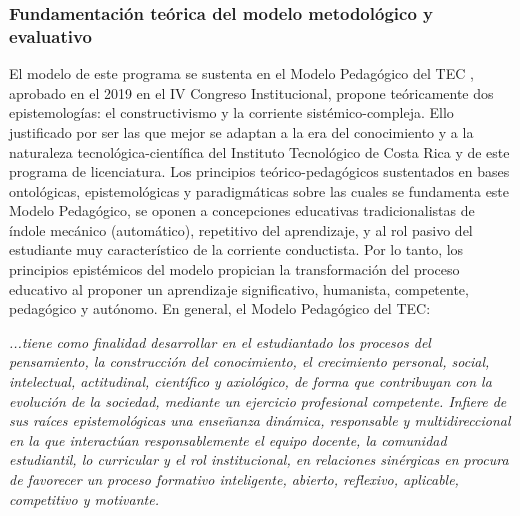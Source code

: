 \subsubsection*{Fundamentación teórica del modelo metodológico y evaluativo}

El modelo de este programa se sustenta en el Modelo Pedagógico del TEC , aprobado en el 2019 en el IV Congreso Institucional, propone teóricamente dos epistemologías: el constructivismo y la corriente sistémico-compleja. Ello justificado por ser las que mejor se adaptan a la era del conocimiento y a la naturaleza tecnológica-científica del Instituto Tecnológico de Costa Rica y de este programa de licenciatura. Los principios teórico-pedagógicos sustentados en bases ontológicas, epistemológicas y paradigmáticas sobre las cuales se fundamenta este Modelo Pedagógico, se oponen a concepciones educativas tradicionalistas de índole mecánico (automático), repetitivo del aprendizaje, y al rol pasivo del estudiante muy característico de la corriente conductista. Por lo tanto, los principios epistémicos del modelo propician la transformación del proceso educativo al proponer un aprendizaje significativo, humanista, competente, pedagógico y autónomo. En general, el Modelo Pedagógico del TEC:\par

\textit{...tiene como finalidad desarrollar en el estudiantado los procesos del pensamiento, la construcción del conocimiento, el crecimiento personal, social, intelectual, actitudinal, científico y axiológico, de forma que contribuyan con la evolución de la sociedad, mediante un ejercicio profesional competente. Infiere de sus raíces epistemológicas una enseñanza dinámica, responsable y multidireccional en la que interactúan responsablemente el equipo docente, la comunidad estudiantil, lo curricular y el rol institucional, en relaciones sinérgicas en procura de favorecer un proceso formativo inteligente, abierto, reflexivo, aplicable, competitivo y motivante.}\par

